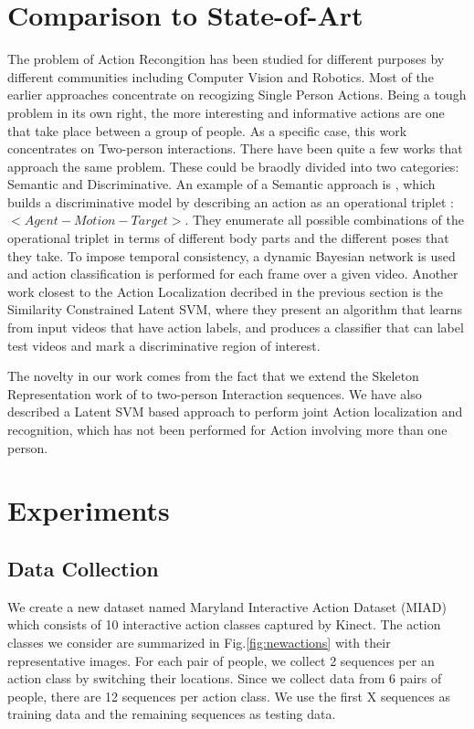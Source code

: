 \documentclass[10pt,twocolumn,letterpaper]{article}
\begin{document}
\section{Comparison to State-of-Art}
The problem of Action Recongition has been studied for different purposes by different communities including Computer Vision and Robotics. Most of the earlier approaches concentrate on recogizing Single Person Actions. Being a tough problem in its own right, the more interesting and informative actions are one that take place between a group of people. As a specific case, this work concentrates on Two-person interactions. There have been quite a few works that approach the same problem. These could be braodly divided into two categories: Semantic and Discriminative. An example of a Semantic approach is \cite{SUHA}, which builds a discriminative model by describing an action as an operational triplet : $<Agent-Motion-Target>$. They enumerate all possible combinations of the operational triplet in terms of different body parts and the different poses that they take. To impose temporal consistency, a dynamic Bayesian network is used and action classification is performed for each frame over a given video. Another work closest to the Action Localization decribed in the previous section is the Similarity Constrained Latent SVM, where they present an algorithm that learns from input videos that have action labels, and produces a classifier that can label test videos and mark a discriminative region of interest.

The novelty in our work comes from the fact that we extend the Skeleton Representation work of \cite{Vemulapalli2013} to two-person Interaction sequences. We have also described a Latent SVM based approach to perform joint Action localization and recognition, which has not been performed for Action involving more than one person. 



\section{Experiments}

\subsection{Data Collection}

We create a new dataset named Maryland Interactive Action Dataset (MIAD) which consists of 10 interactive action classes captured by Kinect. The action classes we consider are summarized in Fig.\ref{fig:newactions} with their representative images. For each pair of people, we collect 2 sequences per an action class by switching their locations. Since we collect data from 6 pairs of people, there are 12 sequences per action class. We use the first X sequences as training data and the remaining sequences as testing data.
\end{document}
